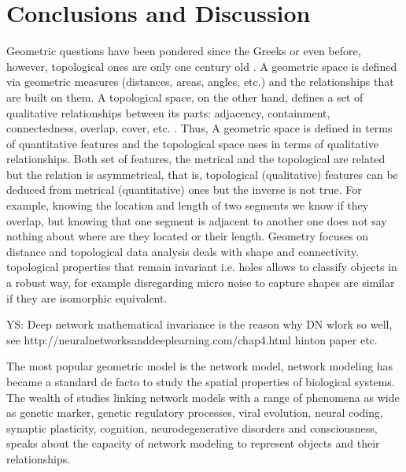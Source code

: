 \documentclass[onecollarge,runningheads]{svjour2}
\begin{document}

\section{Conclusions and Discussion}
\label{se:conclusion}

Geometric questions have been pondered since the Greeks or even before, however, topological ones are only one century old  \cite{edelsbrunner2010computational}. A geometric space is defined via geometric measures (distances, areas, angles, etc.) and the relationships that are built on them. A topological space, on the other hand, defines a set of qualitative relationships between its parts: adjacency, containment, connectedness, overlap, cover, etc. \cite{aleksandrov1999mathematics}. Thus, A geometric space is defined in terms of quantitative features and the topological space uses
in terms of qualitative relationships.  Both set of features, the metrical and the topological are related but the relation is asymmetrical, that is, topological (qualitative) features can be deduced from metrical (quantitative) ones but the inverse is not true. For example, knowing the location and length of two segments we know if they overlap, but knowing that one segment is adjacent to another one does not say nothing about where are they located or their length. Geometry focuses on distance and topological data analysis deals with shape and connectivity. 
topological properties that remain invariant i.e. holes allows to classify objects in a robust way, for example disregarding micro noise to capture shapes are similar if they are isomorphic equivalent.

YS: Deep network mathematical invariance is the reason why DN wlork so well, see http://neuralnetworksanddeeplearning.com/chap4.html hinton paper etc.

The most popular geometric model is the network model, network modeling has became a standard de facto to study the spatial properties of biological systems. The wealth of studies linking network models with a range of phenomena as wide as genetic marker, genetic regulatory processes, viral evolution, neural coding, synaptic plasticity, cognition, neurodegenerative disorders and consciousness, speaks about the capacity of network modeling to represent objects and their relationships. 
\end{document}
